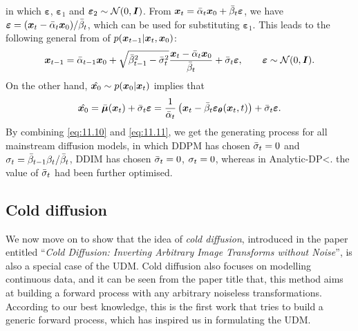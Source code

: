 in which $\bm{\varepsilon}$, $\bm{\varepsilon}_1$ and $\bm{\varepsilon}_2\sim\mathcal{N}(0,\bm{I})$. From $\bm{x}_{t}=\bar{\alpha}_t\bm{x}_0+\bar{\beta}_t\bm{\varepsilon}$, we have $\bm{\varepsilon}=(\bm{x}_{t}-\bar{\alpha}_t\bm{x}_0)/\bar{\beta}_t$, which can be used for substituting $\bm{\varepsilon}_1$. This leads to the following general from of $p(\bm{x}_{t-1}|\bm{x}_{t},\bm{x}_0)$:
\begin{equation}
    \label{eq:11.10}
    \bm{x}_{t-1} = \bar{\alpha}_{t-1}\bm{x}_0+ \sqrt{\bar{\beta}_{t-1}^2-\bar{\sigma}_t^2}\frac{\bm{x}_{t}-\bar{\alpha}_t\bm{x}_0}{\bar{\beta}_t}+\bar{\sigma}_t\bm{\varepsilon},\qquad \bm{\varepsilon}\sim\mathcal{N}(0,\bm{I}).
\end{equation}
On the other hand, $\hat{\bm{x}_0}\sim p(\bm{x}_0|\bm{x}_{t})$ implies that 
\begin{equation}
    \label{eq:11.11}
    \hat{\bm{x}_0}=\bar{\bm{\mu}}(\bm{x}_{t})+\bar{\sigma}_t\bm{\varepsilon}=\frac{1}{\bar{\alpha}_t}\left(\bm{x}_{t}-\bar{\beta}_t \bm{\varepsilon}_{\bm{\theta}}(\bm{x}_{t},t)\right)+\bar{\sigma}_t\bm{\varepsilon}.
\end{equation}
By combining \cref{eq:11.10} and \cref{eq:11.11}, we get the generating process for all mainstream diffusion models, in which DDPM has chosen $\bar{\sigma}_t=0$ and $\sigma_t=\bar{\beta}_{t-1}\beta_t/\bar{\beta}_t$, DDIM has chosen $\bar{\sigma}_t=0$, $\sigma_t=0$, whereas in Analytic-DP<. the value of $\bar{\sigma}_t$ had been further optimised.

\subsection{Cold diffusion}
We now move on to show that the idea of \emph{cold diffusion}, introduced in the paper entitled ``\emph{Cold Diffusion: Inverting Arbitrary Image Transforms without Noise}''\cite{bansal2023cold}, is also a special case of the UDM. Cold diffusion also focuses on modelling continuous data, and it can be seen from the paper title that, this method aims at building a forward process with any arbitrary noiseless transformations. According to our best knowledge, this is the first work that tries to build a generic forward process, which has inspired us in formulating the UDM.


